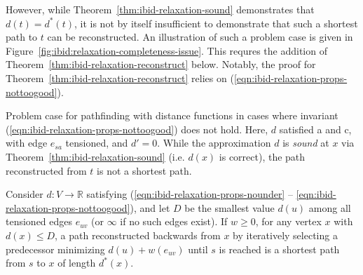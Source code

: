 However,
while Theorem~\ref{thm:ibid-relaxation-sound} demonstrates
that $d(t) = d^*(t)$,
it is not by itself insufficient
to demonstrate that such a shortest path to $t$ can be reconstructed.
An illustration of such a problem case is given in
Figure~\ref{fig:ibid:relaxation-completeness-issue}.
This requres the addition of
Theorem~\ref{thm:ibid-relaxation-reconstruct} below.
Notably,
the proof for Theorem~\ref{thm:ibid-relaxation-reconstruct}
relies on (\ref{eqn:ibid-relaxation-props-nottoogood}).

\begin{marginfigure}
   \centering
   \caption{Problem case for pathfinding with distance functions
      in cases where invariant (\ref{eqn:ibid-relaxation-props-nottoogood})
      does not hold.
      Here, $d$ satisfied a and c, with edge $e_{sa}$ tensioned,
      and $d' = 0$.
      While the approximation $d$ is \emph{sound} at $x$
      via Theorem~\ref{thm:ibid-relaxation-sound}
      (i.e. $d(x)$ is correct),
      the path reconstructed from $t$ is not a shortest path.}
   \label{fig:ibid:relaxation-completeness-issue}
\end{marginfigure}

\begin{theorem}
Consider $d: V \rightarrow \mathbb{R}$
satisfying (\ref{eqn:ibid-relaxation-props-nounder} --
\ref{eqn:ibid-relaxation-props-nottoogood}),
and let $D$ be the smallest value $d(u)$
among all tensioned edges $e_{uv}$
(or $\infty$ if no such edges exist).
If $w \geq 0$,
for any vertex $x$ with $d(x) \leq D$,
a path reconstructed backwards from $x$ by iteratively selecting a
predecessor minimizing $d(u) + w(e_{uv})$ until $s$ is reached
is a shortest path from $s$ to $x$ of length $d^*(x)$.
\label{thm:ibid-relaxation-reconstruct}
\end{theorem}

